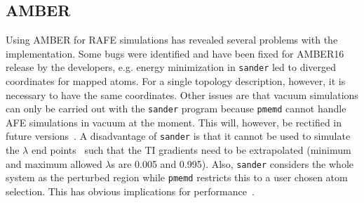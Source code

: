 \documentclass[journal=jctcce,manuscript=article]{achemso}
\newcommand{\progname}[1]{\texttt{#1}}
\begin{document}


\subsection{AMBER}
\label{sec:amber-results}

Using AMBER for RAFE simulations has revealed several problems with
the implementation.  Some bugs were identified and have been fixed for AMBER16 
release by the developers, e.g. energy minimization in \progname{sander} led to 
diverged coordinates for mapped atoms.  For a single topology description, 
however, it is necessary to have the same coordinates.  Other issues are that 
vacuum simulations can only be carried out with the \progname{sander} program 
because \progname{pmemd} cannot handle AFE simulations in vacuum at the 
moment.  This will, however, be rectified in future 
versions~\cite{doi:10.1021/acs.jctc.7b00102}.  A disadvantage of 
\progname{sander} is that it cannot be used to simulate the $\lambda$ end 
points~\cite{doi:10.1021/ct400340s} such that the TI gradients need to be 
extrapolated (minimum and maximum allowed $\lambda$s are 0.005 and 0.995). 
 Also, \progname{sander} considers the whole system as the perturbed
region while \progname{pmemd} restricts this to a user chosen atom selection.  
This
has obvious implications for performance~\cite{doi:10.1021/ct400340s}.
\end{document}
